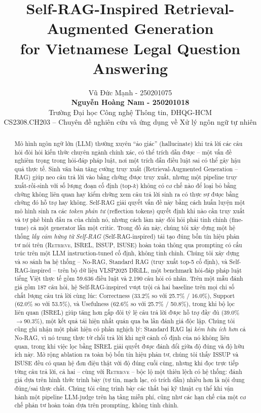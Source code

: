 \documentclass[11pt]{article}
\title{Self-RAG-Inspired Retrieval-Augmented Generation \\ for Vietnamese Legal Question Answering}
\author{
  Vũ Đức Mạnh - 250201075 \\
  \textbf{Nguyễn Hoàng Nam - 250201018} \\
  Trường Đại học Công nghệ Thông tin, ĐHQG-HCM \\
  CS2308.CH203 -- Chuyên đề nghiên cứu và ứng dụng về Xử lý ngôn ngữ tự nhiên 
}
\begin{document}
\maketitle

\begin{abstract}
Mô hình ngôn ngữ lớn (LLM) thường xuyên ``ảo giác'' (hallucinate) khi trả lời các câu hỏi đòi hỏi kiến thức chuyên ngành chính xác, có thể trích dẫn được -- một vấn đề nghiêm trọng trong hỏi-đáp pháp luật, nơi một trích dẫn điều luật sai có thể gây hậu quả thực tế. Sinh văn bản tăng cường truy xuất (Retrieval-Augmented Generation -- RAG) giúp neo câu trả lời vào bằng chứng được truy xuất, nhưng một pipeline truy xuất-rồi-sinh với số lượng đoạn cố định (top-$k$) không có cơ chế nào để loại bỏ bằng chứng không liên quan hay kiểm chứng xem câu trả lời sinh ra có thực sự được bằng chứng đó hỗ trợ hay không. Self-RAG \citep{asai2024selfrag} giải quyết vấn đề này bằng cách huấn luyện một mô hình sinh ra các \emph{token phản tư} (reflection tokens) quyết định khi nào cần truy xuất và tự phê bình đầu ra của chính nó, nhưng cách làm này đòi hỏi phải tinh chỉnh (fine-tune) cả một generator lẫn một critic. Trong đồ án này, chúng tôi xây dựng một hệ thống \emph{lấy cảm hứng từ Self-RAG} (Self-RAG-inspired) tái tạo đúng bốn tín hiệu phản tư nói trên (\textsc{Retrieve}, \textsc{ISREL}, \textsc{ISSUP}, \textsc{ISUSE}) hoàn toàn thông qua prompting có cấu trúc trên một LLM instruction-tuned cố định, không tinh chỉnh. Chúng tôi xây dựng và so sánh ba hệ thống -- No-RAG, Standard RAG (truy xuất top-5 cố định), và Self-RAG-inspired -- trên bộ dữ liệu VLSP2025 DRiLL, một benchmark hỏi-đáp pháp luật tiếng Việt thực tế gồm 59.636 điều luật và 2.190 câu hỏi có nhãn. Trên một mẫu đánh giá gồm 187 câu hỏi, hệ Self-RAG-inspired vượt trội cả hai baseline trên mọi chỉ số chất lượng câu trả lời cùng lúc: Correctness (33.2\% so với 25.7\% / 16.0\%), Support (62.0\% so với 53.5\%), và Usefulness (62.6\% so với 25.7\% / 50.8\%), trong khi bộ lọc liên quan (\textsc{ISREL}) giúp tăng hơn gấp đôi tỷ lệ câu trả lời được hỗ trợ đầy đủ (39.0\%$\to$90.3\%), một kết quả tái hiện nhất quán qua ba lần đánh giá độc lập. Chúng tôi cũng ghi nhận một phát hiện có phần nghịch lý: Standard RAG lại \emph{kém hữu ích hơn} cả No-RAG, vì nó trung thực từ chối trả lời khi ngữ cảnh cố định của nó không liên quan, trong khi việc lọc bằng \textsc{ISREL} giải quyết được đánh đổi giữa độ đúng và độ hữu ích này. Mở rộng ablation ra toàn bộ bốn tín hiệu phản tư, chúng tôi thấy \textsc{ISSUP} và \textsc{ISUSE} đều có quan hệ đơn điệu thật với độ đúng cuối cùng, nhưng khi đọc trực tiếp từng câu trả lời, cả hai -- cùng với \textsc{Retrieve} -- bộc lộ một thiên lệch có hệ thống: đánh giá dựa trên hình thức trình bày (tự tin, mạch lạc, có trích dẫn) nhiều hơn là nội dung đúng/sai thực chất. Chúng tôi cũng trình bày các thất bại kỹ thuật cụ thể khi vận hành một pipeline LLM-judge trên hạ tầng miễn phí, cũng như các hạn chế của một cơ chế phản tư hoàn toàn dựa trên prompting, không tinh chỉnh.
\end{abstract}
\end{document}
